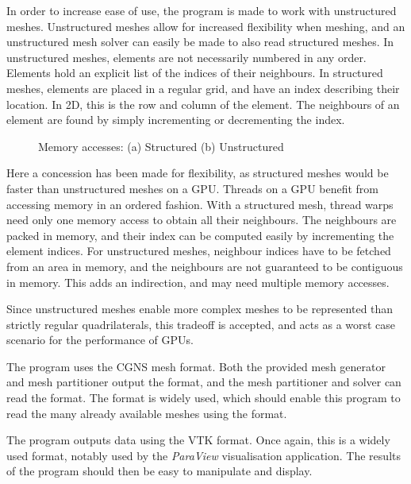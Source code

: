 In order to increase ease of use, the program is made to work with unstructured meshes. Unstructured
meshes allow for increased flexibility when meshing, and an unstructured mesh solver can easily be
made to also read structured meshes. In unstructured meshes, elements are not necessarily numbered
in any order. Elements hold an explicit list of the indices of their neighbours. In structured
meshes, elements are placed in a regular grid, and have an index describing their location. In 2D,
this is the row and column of the element. The neighbours of an element are found by simply
incrementing or decrementing the index.

\begin{figure}[H]
	\centering
	\hfill
	\caption{Memory accesses: (a) Structured (b) Unstructured}
	\label{fig:mesh_memory}
\end{figure}

Here a concession has been made for flexibility, as structured meshes would be faster than
unstructured meshes on a GPU. Threads on a GPU benefit from accessing memory in an ordered fashion.
With a structured mesh, thread warps need only one memory access to obtain all their neighbours. The
neighbours are packed in memory, and their index can be computed easily by incrementing the element
indices. For unstructured meshes, neighbour indices have to be fetched from an area in memory, and
the neighbours are not guaranteed to be contiguous in memory. This adds an indirection, and may need
multiple memory accesses.

Since unstructured meshes enable more complex meshes to be represented than strictly regular
quadrilaterals, this tradeoff is accepted, and acts as a worst case scenario for the performance of
GPUs.

The program uses the CGNS mesh format. Both the provided mesh generator and mesh partitioner output
the format, and the mesh partitioner and solver can read the format. The format is widely used,
which should enable this program to read the many already available meshes using the format.

The program outputs data using the VTK format. Once again, this is a widely used format, notably
used by the \textit{ParaView} visualisation application. The results of the program should then be
easy to manipulate and display.

